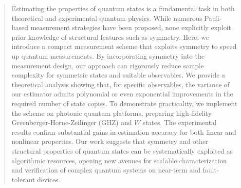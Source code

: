 \documentclass[prl,aps,twocolumn,notitlepage,superscriptaddress,showpacs,nofootinbib]{revtex4-2}
\newcommand{\red}[1]{{\color{red} #1}}
\begin{document}
\begin{abstract}
\pagewiselinenumbers
\modulolinenumbers[1]
\linenumbers
Estimating the properties of quantum states is a fundamental task in both theoretical and experimental quantum physics. While numerous Pauli-based measurement strategies have been proposed, none explicitly exploit prior knowledge of structural features such as symmetry. Here, we introduce a compact measurement scheme that exploits symmetry to speed up quantum measurements. By incorporating symmetry into the measurement design, \red{our approach can rigorously reduce sample complexity for symmetric states and suitable observables.} We provide a theoretical analysis showing that, for specific observables, the variance of our estimator admits polynomial or even exponential improvements in the required number of state copies. To demonstrate practicality, we implement the scheme on photonic quantum platforms, preparing high-fidelity Greenberger-Horne-Zeilinger (GHZ) and $W$ states. The experimental results confirm substantial gains in estimation accuracy for both linear and nonlinear properties. Our work suggests that symmetry and other structural properties of quantum states can be systematically exploited as algorithmic resources, opening new avenues for scalable characterization and verification of complex quantum systems on near-term and fault-tolerant devices.


\end{abstract}

\maketitle
\pagewiselinenumbers
\modulolinenumbers[1]
\linenumbers
\end{document}
